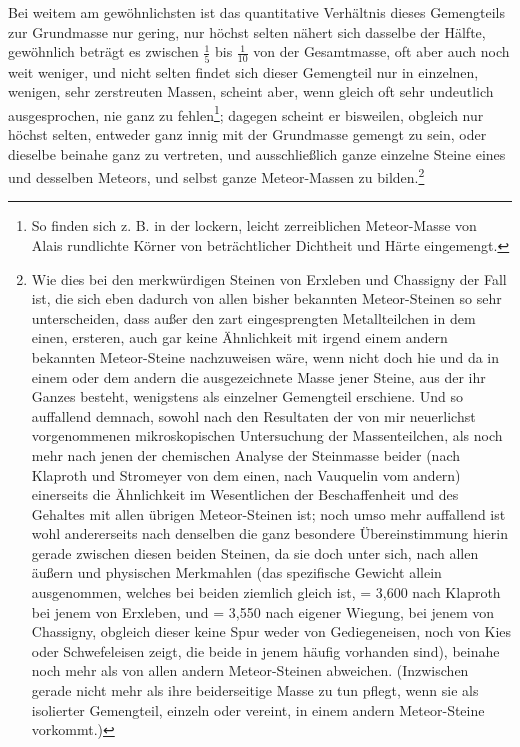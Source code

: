 \documentclass[a4paper, 11pt, oneside, german]{article}
\begin{document}
Bei weitem am gewöhnlichsten ist das quantitative Verhältnis dieses Gemengteils zur Grundmasse nur gering, nur höchst selten nähert sich dasselbe der Hälfte, gewöhnlich beträgt es zwischen $\frac{1}{5}$ bis $\frac{1}{10}$ von der Gesamtmasse, oft aber auch noch weit weniger, und nicht selten findet sich dieser Gemengteil nur in einzelnen, wenigen, sehr zerstreuten Massen, scheint aber, wenn gleich oft sehr undeutlich ausgesprochen, nie ganz zu fehlen\footnote{So finden sich z. B. in der lockern, leicht zerreiblichen Meteor-Masse von Alais rundlichte Körner von beträchtlicher Dichtheit und Härte eingemengt.}; dagegen scheint er bisweilen, obgleich nur höchst selten, entweder ganz innig mit der Grundmasse gemengt zu sein, oder dieselbe beinahe ganz zu vertreten, und ausschließlich ganze einzelne Steine eines und desselben Meteors, und selbst ganze Meteor-Massen zu bilden.\footnote{Wie dies bei den merkwürdigen Steinen von Erxleben und Chassigny der Fall ist, die sich eben dadurch von allen bisher bekannten Meteor-Steinen so sehr unterscheiden, dass außer den zart eingesprengten Metallteilchen in dem einen, ersteren, auch gar keine Ähnlichkeit mit irgend einem andern bekannten Meteor-Steine nachzuweisen wäre, wenn nicht doch hie und da in einem oder dem andern die ausgezeichnete Masse jener Steine, aus der ihr Ganzes besteht, wenigstens als einzelner Gemengteil erschiene. Und so auffallend demnach, sowohl nach den Resultaten der von mir neuerlichst vorgenommenen mikroskopischen Untersuchung der Massenteilchen, als noch mehr nach jenen der chemischen Analyse der Steinmasse beider (nach Klaproth und Stromeyer von dem einen, nach Vauquelin vom andern) einerseits die Ähnlichkeit im Wesentlichen der Beschaffenheit und des Gehaltes mit allen übrigen Meteor-Steinen ist; noch umso mehr auffallend ist wohl andererseits nach denselben die ganz besondere Übereinstimmung hierin gerade zwischen diesen beiden Steinen, da sie doch unter sich, nach allen äußern und physischen Merkmahlen (das spezifische Gewicht allein ausgenommen, welches bei beiden ziemlich gleich ist, = 3,600 nach Klaproth bei jenem von Erxleben, und = 3,550 nach eigener Wiegung, bei jenem von Chassigny, obgleich dieser keine Spur weder von Gediegeneisen, noch von Kies oder Schwefeleisen zeigt, die beide in jenem häufig vorhanden sind), beinahe noch mehr als von allen andern Meteor-Steinen abweichen. (Inzwischen gerade nicht mehr als ihre beiderseitige Masse zu tun pflegt, wenn sie als isolierter Gemengteil, einzeln oder vereint, in einem andern Meteor-Steine vorkommt.)}
\end{document}
